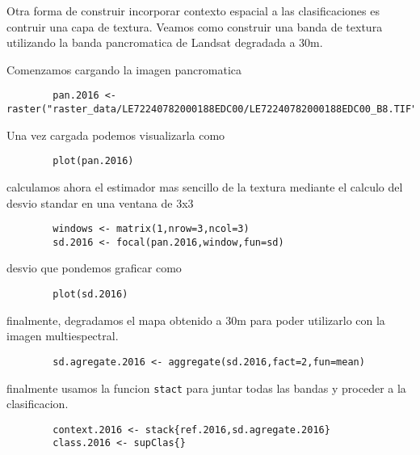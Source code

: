 Otra forma de construir incorporar contexto espacial a las clasificaciones es
contruir una capa de textura. Veamos como construir una banda de textura
utilizando la banda pancromatica de Landsat degradada a 30m.

\begin{exa}
    Comenzamos cargando la imagen pancromatica
    \begin{lstlisting}
        pan.2016 <- raster("raster_data/LE72240782000188EDC00/LE72240782000188EDC00_B8.TIF")
    \end{lstlisting}
    Una vez cargada podemos visualizarla como 
    \begin{lstlisting}
        plot(pan.2016)
    \end{lstlisting}
    calculamos ahora el estimador mas sencillo de la textura mediante el calculo
    del desvio standar en una ventana de 3x3
    \begin{lstlisting}
        windows <- matrix(1,nrow=3,ncol=3)
        sd.2016 <- focal(pan.2016,window,fun=sd)
    \end{lstlisting}
    desvio que pondemos graficar como
    \begin{lstlisting}
        plot(sd.2016)
    \end{lstlisting}
    finalmente, degradamos el mapa obtenido a 30m para poder utilizarlo con la
    imagen multiespectral.
    \begin{lstlisting}
        sd.agregate.2016 <- aggregate(sd.2016,fact=2,fun=mean)
    \end{lstlisting}
    finalmente usamos la funcion \texttt{stact} para juntar todas las bandas y
    proceder a la clasificacion.
    \begin{lstlisting}
        context.2016 <- stack{ref.2016,sd.agregate.2016}
        class.2016 <- supClas{}
    \end{lstlisting}
\end{exa}
